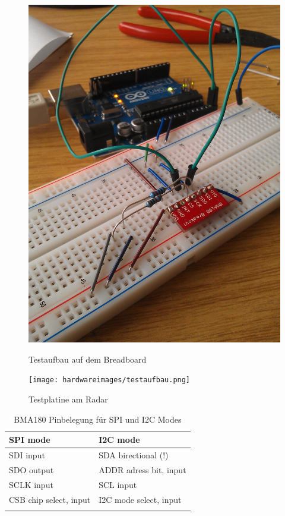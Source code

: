 \documentclass[12pt,a4paper]{scrartcl}
\begin{document}
\begin{figure}[htb]
\begin{minipage}[H]{8cm}
	\centering
	\includegraphics[scale=.111]{hardwareimages/breadboard.jpg}
	\caption{Testaufbau auf dem Breadboard}
	\label{breadboard}
\end{minipage}
\hfill
\begin{minipage}[H]{8cm}
	\centering
	\texttt{[image: hardwareimages/testaufbau.png]}
	\caption{Testplatine am Radar}
	\label{testaufbau}
\end{minipage}
\end{figure}



\begin{table}[htb]
\begin{tabular}{@{}ll@{}}      
    	\cmidrule(r){1-2}\morecmidrules\cmidrule(r){1-2}
       	SPI mode & I2C mode\\
      	\midrule
 	SDI input & SDA birectional (!) \\ 
 	SDO output & ADDR adress bit, input \\
 	SCLK input & SCL input \\
 	CSB chip select, input & I2C mode select, input \\
 	 \addlinespace
 	 \bottomrule
 \end{tabular}
\caption{BMA180 Pinbelegung für SPI und I2C Modes \citep{Sensortec:2009rt}}
\label{i2cmode}
\end{table}
\end{document}
